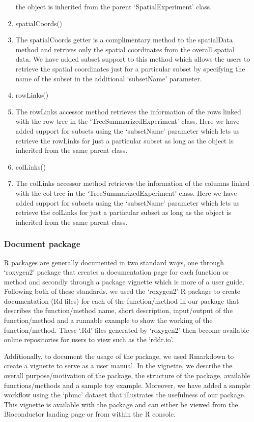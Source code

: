 \documentclass[
]{article}
\begin{document}
\begin{enumerate}
  the object is inherited from the parent `SpatialExperiment' class.
\item
  spatialCoords()
\item
  The spatialCoords getter is a complimentary method to the spatialData
  method and retrives only the spatial coordinates from the overall
  spatial data. We have added subset support to this method which allows
  the users to retrieve the spatial coordinates just for a particular
  subset by specifying the name of the subset in the additional
  `subsetName' parameter.
\item
  rowLinks()
\item
  The rowLinks accessor method retrieves the information of the rows
  linked with the row tree in the `TreeSummarizedExperiment' class. Here
  we have added support for subsets using the `subsetName' parameter
  which lets us retrieve the rowLinks for just a particular subset as
  long as the object is inherited from the same parent class.
\item
  colLinks()
\item
  The colLinks accessor method retrieves the information of the columns
  linked with the col tree in the `TreeSummarizedExperiment' class. Here
  we have added support for subsets using the `subsetName' parameter
  which lets us retrieve the colLinks for just a particular subset as
  long as the object is inherited from the same parent class.
\end{enumerate}

\hypertarget{document-package}{%
\subsubsection{Document package}\label{document-package}}

R packages are generally documented in two standard ways, one through
`roxygen2' package that creates a documentation page for each function
or method and secondly through a package vignette which is more of a
user guide. Following both of these standards, we used the `roxygen2' R
package to create documentation (Rd files) for each of the
function/method in our package that describes the function/method name,
short description, input/output of the function/method and a runnable
example to show the working of the function/method. These `.Rd' files
generated by `roxygen2' then become available online repositories for
users to view such as the `rddr.io'.

Additionally, to document the usage of the package, we used Rmarkdown to
create a vignette to serve as a user manual. In the vignette, we
describe the overall purpose/motivation of the package, the structure of
the package, available functions/methods and a sample toy example.
Moreover, we have added a sample workflow using the `pbmc' dataset that
illustrates the usefulness of our package. This vignette is available
with the package and can either be viewed from the Bioconductor landing
page or from within the R console.
\end{document}
